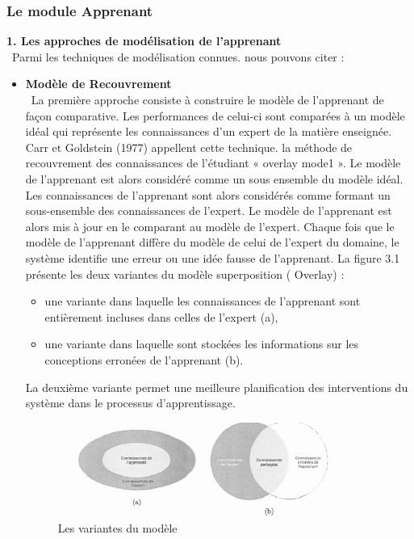 \subsubsection{Le module Apprenant}
\textbf{1. Les approches de modélisation de l'apprenant} \\\
Parmi les techniques de modélisation connues. nous pouvons citer :
\begin{itemize}
\item \textbf{Modèle de Recouvrement} \\\
La première approche consiste à construire le modèle de l'apprenant de façon
comparative. Les performances de celui-ci sont comparées à un modèle idéal qui
représente les connaissances d'un expert de la matière enseignée. Carr et Goldstein (1977) appellent cette technique. la méthode de recouvrement des connaissances de l'étudiant « overlay mode1 ». Le modèle de l'apprenant est alors considéré comme un sous ensemble du modèle idéal.
Les connaissances de l'apprenant sont alors considérés comme formant un sous-ensemble des connaissances de l'expert. Le modèle de l'apprenant est alors mis à jour en le comparant au modèle de l'expert. Chaque fois que le modèle de l'apprenant diffère du modèle de celui de l'expert du domaine, le système identifie une erreur ou une idée fausse de l'apprenant.
 La figure 3.1 présente les deux variantes du modèle superposition ( Overlay) : 
 \begin{itemize}
\item une variante dans laquelle les connaissances de l'apprenant sont entièrement incluses dans celles de l'expert (a),
\item une variante dans laquelle sont stockées les informations sur les conceptions erronées de l'apprenant (b).
\end{itemize}
 La deuxième variante permet une meilleure planification des interventions du système dans le processus d'apprentissage. 
 
\begin{figure}
    \centering
    \includegraphics[width=0.9\textwidth]{figures/mdele.png}
    \captionsetup{justification=centering}
    \caption{Les variantes du modèle}
\end{figure}


\end{itemize}
